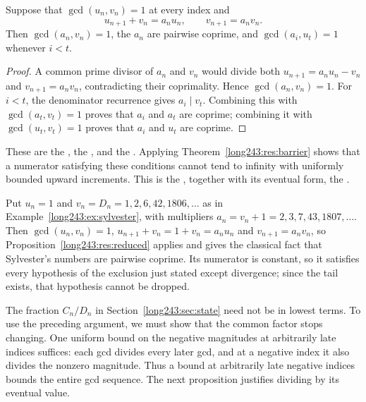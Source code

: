 \documentclass[11pt]{article}
\begin{document}
\begin{proposition}\label{long243:res:reduced}
Suppose that $\gcd(u_n,v_n)=1$ at every index and
\[
 u_{n+1}+v_n=a_nu_n,\qquad v_{n+1}=a_nv_n.
\]
Then $\gcd(a_n,v_n)=1$, the $a_n$ are pairwise coprime, and
$\gcd(a_i,u_t)=1$ whenever $i<t$.
\end{proposition}

\begin{proof}
A common prime divisor of $a_n$ and $v_n$ would divide both
$u_{n+1}=a_nu_n-v_n$ and $v_{n+1}=a_nv_n$, contradicting their
coprimality. Hence $\gcd(a_n,v_n)=1$.
For $i<t$, the denominator recurrence gives $a_i\mid v_t$.
Combining this with $\gcd(a_t,v_t)=1$ proves that $a_i$ and $a_t$
are coprime; combining it with $\gcd(u_t,v_t)=1$ proves that $a_i$
and $u_t$ are coprime.
\end{proof}

\noindent These are the
, the
, and the
. Applying Theorem~\ref{long243:res:barrier}
shows that a numerator satisfying these conditions cannot tend to infinity
with uniformly bounded upward increments. This is the
, together with its eventual form, the
.

\begin{example}\label{long243:ex:reduced}
Put $u_n=1$ and $v_n=D_n=1,2,6,42,1806,\ldots$ as in
Example~\ref{long243:ex:sylvester}, with multipliers $a_n=v_n+1=2,3,7,43,1807,\ldots$.
Then $\gcd(u_n,v_n)=1$, $u_{n+1}+v_n=1+v_n=a_nu_n$ and $v_{n+1}=a_nv_n$, so
Proposition~\ref{long243:res:reduced} applies and gives the classical fact
that Sylvester's numbers are pairwise coprime.  Its numerator is
constant, so it satisfies every hypothesis of the exclusion just stated except
divergence; since the tail exists, that hypothesis cannot be dropped.
\end{example}

The fraction $C_n/D_n$ in Section~\ref{long243:sec:state} need not be in lowest terms.
To use the preceding argument, we must show that the common factor stops
changing. One uniform bound on the negative magnitudes at arbitrarily
late indices suffices: each gcd divides every later gcd, and at a negative
index it also divides the nonzero magnitude. Thus a bound at arbitrarily
late negative indices bounds the entire gcd sequence. The next proposition
justifies dividing by its eventual value.
\end{document}

